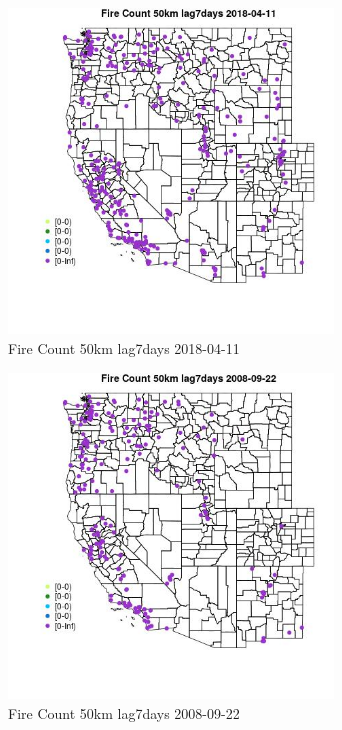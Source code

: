 \begin{figure} 
\centering  
\includegraphics[width=0.77\textwidth]{Code_Outputs/Report_ML_input_PM25_Step4_part_e_de_duplicated_aves_compiled_2019-05-18wNAs_MapObsFire_Count_50km_lag7days2018-04-11.jpg} 
\caption{\label{fig:Report_ML_input_PM25_Step4_part_e_de_duplicated_aves_compiled_2019-05-18wNAsMapObsFire_Count_50km_lag7days2018-04-11}Fire Count 50km lag7days 2018-04-11} 
\end{figure} 
 

\begin{figure} 
\centering  
\includegraphics[width=0.77\textwidth]{Code_Outputs/Report_ML_input_PM25_Step4_part_e_de_duplicated_aves_compiled_2019-05-18wNAs_MapObsFire_Count_50km_lag7days2008-09-22.jpg} 
\caption{\label{fig:Report_ML_input_PM25_Step4_part_e_de_duplicated_aves_compiled_2019-05-18wNAsMapObsFire_Count_50km_lag7days2008-09-22}Fire Count 50km lag7days 2008-09-22} 
\end{figure} 
 

